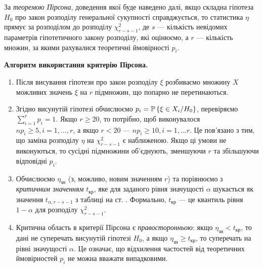 За \emph{теоремою Пірсона}, доведення якої буде наведено далі, якщо складна гіпотеза $H_0$ про закон розподілу генеральної сукупності 
справджується, то статистика $\eta$ прямує за розподілом до розподілу $\chi^2_{r-s-1}$, де $s$ --- кількість невідомих параметрів гіпотетичного закону розподілу,
які оцінюємо, а $r$ --- кількість множин, за якими рахувалися теоретичні ймовірності $p_i$.

\textbf{Алгоритм використання критерію Пірсона.}
\begin{enumerate}
    \item Після висування гіпотези про закон розподілу $\xi$ розбиваємо множину $X$ можливих значень $\xi$ на $r$ підмножин, що попарно не перетинаються.
    \item Згідно висунутій гіпотезі обчислюємо $p_i = \P\left\{\xi \in X_i / H_0 \right\}$, перевіряємо $\sum\limits_{i=1}^r p_i = 1$.
    Якщо $r\geq 20$, то потрібно, щоб виконувалося $n p_i \geq 5, i = 1, ..., r$, а якщо $r<20$ --- $n p_i \geq 10, i = 1, ... r$. Це пов'язано з тим, що
    заміна розподілу $\eta$ на $\chi^2_{r-s-1}$ є наближеною. Якщо ці умови не виконуються, то сусідні підмножини об'єднують, зменшуючи $r$ та збільшуючи відповідні $p_i$.
    \item Обчислюємо $\eta_{\text{зн}}$ (з, можливо, новим значенням $r$) та порівнюємо з \emph{критичним значенням} $t_{\text{кр}}$, яке для заданого рівня значущості $\alpha$
    шукається як значення $t_{\alpha, r-s-1}$ з таблиці на ст. \pageref{table:chi2}. Формально, $t_{\text{кр}}$ --- це квантиль рівня $1-\alpha$ для розподілу $\chi^2_{r-s-1}$.
    \item Критична область в критерії Пірсона є \emph{правосторонньою}: якщо $\eta_{\text{зн}} < t_{\text{кр}}$, то дані не суперечать висунутій гіпотезі $H_0$, а якщо
    $\eta_{\text{зн}} \geq t_{\text{кр}}$, то суперечать на рівні значущості $\alpha$. Це означає, що відхилення частостей від теоретичних ймовірностей $p_i$ не можна вважати випадковими.
\end{enumerate}

